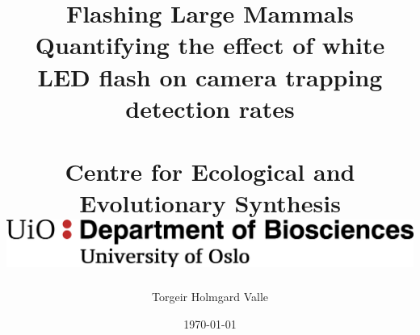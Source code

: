 \title{	
	{\large Flashing Large Mammals}\\
	{\small Quantifying the effect of white LED flash on camera trapping detection rates}\\
	{~}\\
	{\large Centre for Ecological and Evolutionary Synthesis}\\
	{\includegraphics[scale=0.5]{./img/MN_IMBV_A_ENG.png}}\\
}
\author{Torgeir Holmgard Valle}
\date{\today}